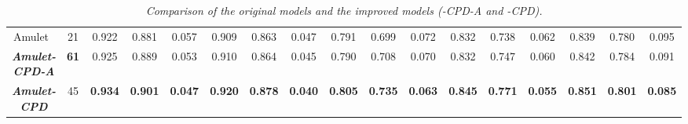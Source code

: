 \documentclass[10pt,twocolumn,letterpaper]{article}
\begin{document}
\begin{table*}[ht]
{\begin{tabular}{c|c|ccc|ccc|ccc|ccc|ccc}
    \hline
    \hline
    Amulet~\cite{2017Amulet}  & 21 & 0.922 & 0.881 & 0.057 & 0.909 & 0.863 & 0.047 & 0.791 & 0.699 & 0.072 & 0.832 & 0.738 & 0.062 & 0.839 & 0.780 & 0.095 \\
    \textbf{\emph{Amulet-CPD-A}} & \textbf{{\color{red}61}} & 0.925 & 0.889 & 0.053 & 0.910 & 0.864 & 0.045 & 0.790 & 0.708 & 0.070 & 0.832 & 0.747 & 0.060 & 0.842 & 0.784 & 0.091 \\
    \textbf{\emph{Amulet-CPD}} & 45 & \textbf{{\color{red}0.934}} & \textbf{{\color{red}0.901}} & \textbf{{\color{red}0.047}} & \textbf{{\color{red}0.920}} & \textbf{{\color{red}0.878}} & \textbf{{\color{red}0.040}} & \textbf{{\color{red}0.805}} & \textbf{{\color{red}0.735}} & \textbf{{\color{red}0.063}} & \textbf{{\color{red}0.845}} & \textbf{{\color{red}0.771}} & \textbf{{\color{red}0.055}} & \textbf{{\color{red}0.851}} & \textbf{{\color{red}0.801}} & \textbf{{\color{red}0.085}} \\
    \hline
    \end{tabular}}
  \caption{\emph{Comparison of the original models and the improved models (-CPD-A and -CPD).}}
  \label{CPD_IN_OtherModels}
\end{table*}
\end{document}
